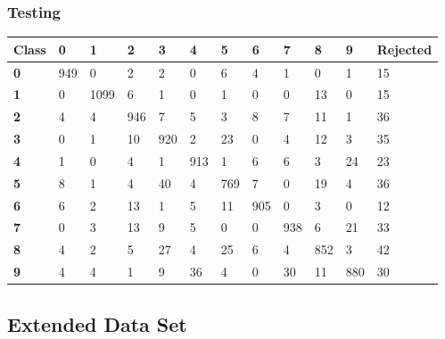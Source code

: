 \documentclass[
  a4paper,            %
  DIV=10,             %
  oneside,            %
  BCOR=5mm,           %
  parskip=half,       %
  numbers=noenddot,   %
  bibtotoc,           %
  listof=totoc,        %
  article
]{scrreprt}
\begin{document}
\subsubsection{Testing}
\begin{center}
  \begin{tabular}{|p{1cm}|p{1cm}|p{1cm}|p{1cm}|p{1cm}|p{1cm}|p{1cm}|p{1cm}|p{1cm}|p{1cm}|p{1cm}|p{1.7cm}|}
  \hline
  \textbf{Class} & \textbf{0} & \textbf{1} & \textbf{2} & \textbf{3} & \textbf{4} & \textbf{5} & \textbf{6} & \textbf{7} & \textbf{8} & \textbf{9} & \textbf{Rejected} \\
  \hline
  \textbf{0} & 949 & 0 & 2 & 2 & 0 & 6 & 4 & 1 & 0 & 1 & 15 \\
  \hline
  \textbf{1} & 0 & 1099 & 6 & 1 & 0 & 1 & 0 & 0 & 13 & 0 & 15 \\
  \hline
  \textbf{2} & 4 & 4 & 946 & 7 & 5 & 3 & 8 & 7 & 11 & 1 & 36 \\
  \hline
  \textbf{3} & 0 & 1 & 10 & 920 & 2 & 23 & 0 & 4 & 12 & 3 & 35 \\
  \hline
  \textbf{4} & 1 & 0 & 4 & 1 & 913 & 1 & 6 & 6 & 3 & 24 & 23 \\
  \hline
  \textbf{5} & 8 & 1 & 4 & 40 & 4 & 769 & 7 & 0 & 19 & 4 & 36 \\
  \hline
  \textbf{6} & 6 & 2 & 13 & 1 & 5 & 11 & 905 & 0 & 3 & 0 & 12 \\
  \hline
  \textbf{7} & 0 & 3 & 13 & 9 & 5 & 0 & 0 & 938 & 6 & 21 & 33 \\
  \hline
  \textbf{8} & 4 & 2 & 5 & 27 & 4 & 25 & 6 & 4 & 852 & 3 & 42 \\
  \hline
  \textbf{9} & 4 & 4 & 1 & 9 & 36 & 4 & 0 & 30 & 11 & 880 & 30 \\
  \hline
  \end{tabular}
\end{center}
\subsection{Extended Data Set}
\end{document}
